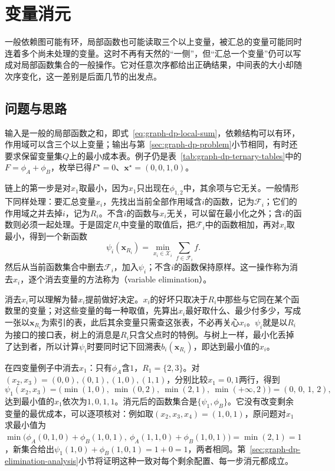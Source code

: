 
\section{变量消元}
\label{sec:graph-variable-elimination}

一般依赖图可能有环，局部函数也可能读取三个以上变量，被汇总的变量可能同时连着多个尚未处理的变量。这时不再有天然的“一侧”，但“汇总一个变量”仍可以写成对局部函数集合的一般操作。它对任意次序都给出正确结果，中间表的大小却随次序变化，这一差别是后面几节的出发点。

\subsection{问题与思路}
\label{sec:graph-dp-elimination-idea}

输入是一般的局部函数之和，即式~\eqref{eq:graph-dp-local-sum}，依赖结构可以有环，作用域可以含三个以上变量；输出与第~\ref{sec:graph-dp-problem}小节相同，有时还要求保留变量集$Q$上的最小成本表。例子仍是表~\ref{tab:graph-dp-ternary-tables}中的$F=\phi_A+\phi_B$，枚举已得$F^\star=0$、$\bm x^\star=(0,0,1,0)$。

链上的第一步是对$x_1$取最小，因为$x_1$只出现在$\phi_{1,2}$中，其余项与它无关。一般情形下同样处理：要汇总变量$x_i$，先找出当前全部作用域含$i$的函数，记为$\mathcal F_i$；它们的作用域之并去掉$i$，记为$R_i$。不含$i$的函数与$x_i$无关，可以留在最小化之外；含$i$的函数则必须一起处理。于是固定$R_i$中变量的取值后，把$\mathcal F_i$中的函数相加，再对$x_i$取最小，得到一个新函数
\begin{equation}
\psi_i(\bm x_{R_i})=\min_{x_i\in\mathcal X_i}\sum_{f\in\mathcal F_i}f .
\label{eq:graph-dp-elimination-step}
\end{equation}
然后从当前函数集合中删去$\mathcal F_i$，加入$\psi_i$；不含$i$的函数保持原样。这一操作称为消去$x_i$，逐个消去变量的方法称为（variable elimination）。

消去$x_i$可以理解为替$x_i$提前做好决定。$x_i$的好坏只取决于$R_i$中那些与它同在某个函数里的变量；对这些变量的每一种取值，先算出$x_i$最好取什么、最少付多少，写成一张以$\bm x_{R_i}$为索引的表，此后其余变量只需查这张表，不必再关心$x_i$。$\psi_i$就是以$R_i$为接口的接口表，树上的消息是$R_i$只含父点时的特例。与树上一样，最小化丢掉了达到者，所以计算$\psi_i$时要同时记下回溯表$b_i(\bm x_{R_i})$，即达到最小值的$x_i$。

在四变量例子中消去$x_1$：只有$\phi_A$含$1$，$R_1=\{2,3\}$。对$(x_2,x_3)=(0,0),(0,1),(1,0),(1,1)$，分别比较$x_1=0,1$两行，得到
\[
\psi_1(x_2,x_3)=\bigl(\min(1,0),\ \min(0,2),\ \min(2,1),\ \min(+\infty,2)\bigr)=(0,\,0,\,1,\,2),
\]
达到最小值的$x_1$依次为$1,0,1,1$。消元后的函数集合是$\{\psi_1,\phi_B\}$。它没有改变剩余变量的最优成本，可以逐项核对：例如取$(x_2,x_3,x_4)=(1,0,1)$，原问题对$x_1$求最小值为$\min\bigl(\phi_A(0,1,0)+\phi_B(1,0,1),\ \phi_A(1,1,0)+\phi_B(1,0,1)\bigr)=\min(2,1)=1$，新集合给出$\psi_1(1,0)+\phi_B(1,0,1)=1+0=1$，两者相同。第~\ref{sec:graph-dp-elimination-analysis}小节将证明这种一致对每个剩余配置、每一步消元都成立。

